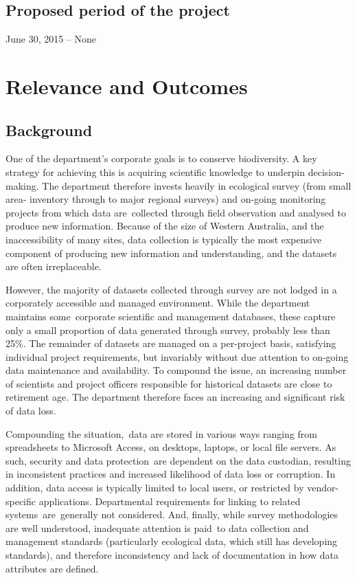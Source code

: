 \documentclass[version=last,
    paper=a4,                               %
    10pt,                                   %
    dvipsnames,
    oneside,                              %
    headings=openany,                       %
    open=any,
    BCOR=7mm,                               %
    DIV=15,     %
]{scrbook}
\begin{document}
\subsection*{Proposed period of the project}
June 30, 2015 -- None



\section*{Relevance and Outcomes}


\subsection*{Background}

One of the department's corporate goals is to conserve biodiversity. A
key strategy for achieving this is acquiring scientific knowledge to
underpin decision-making. The department therefore invests heavily in
ecological survey (from small area- inventory through to major regional
surveys) and on-going monitoring projects from which data are~collected
through field observation and analysed to produce new information.
Because of the size of Western Australia, and the inaccessibility of
many sites, data collection is typically the most expensive component of
producing new information and understanding, and the datasets are often
irreplaceable.

However, the majority of datasets collected through survey are not
lodged in a corporately accessible and managed environment. While the
department maintains some~corporate scientific and management databases,
these capture only a small proportion of data generated through survey,
probably less than 25\%. The remainder of datasets are managed on a
per-project basis, satisfying individual project requirements, but
invariably without due attention to on-going data maintenance and
availability. To compound the issue, an increasing number of scientists
and project officers responsible for historical datasets are close to
retirement age. The department therefore faces an increasing and
significant risk of data loss.

Compounding the situation,~data are stored in various ways ranging from
spreadsheets to Microsoft Access, on desktops, laptops, or local file
servers. As such, security and data protection~are dependent on the data
custodian, resulting in inconsistent practices and increased likelihood
of data loss or corruption. In addition, data access is typically
limited to local users, or restricted by vendor-specific applications.
Departmental requirements for linking to related systems~are~generally
not considered. And, finally, while survey methodologies are well
understood, inadequate attention is paid~to data collection and
management standards (particularly ecological data, which still has
developing standards), and therefore inconsistency and lack of
documentation in how data attributes are defined.
\end{document}
